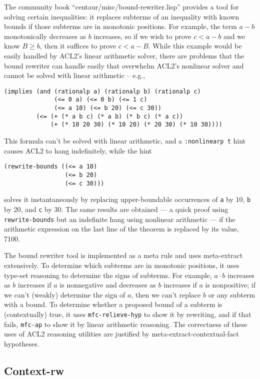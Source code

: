 The community book ``centaur/misc/bound-rewriter.lisp'' provides a
tool for solving certain inequalities: it replaces subterms of an
inequality with known bounds if those subterms are in monotonic
positions.  For example, the term $a-b$ monotonically decreases as $b$
increases, so if we wish to prove $c<a-b$ and we know $B \geq b$, then
it suffices to prove $c<a-B$.  While this example would be easily
handled by ACL2's linear arithmetic solver, there are problems that
the bound rewriter can handle easily that overwhelm ACL2's nonlinear
solver and cannot be solved with linear arithmetic -- e.g.,
\begin{verbatim}
(implies (and (rationalp a) (rationalp b) (rationalp c)
              (<= 0 a) (<= 0 b) (<= 1 c)
              (<= a 10) (<= b 20) (<= c 30))
         (<= (+ (* a b c) (* a b) (* b c) (* a c))
             (+ (* 10 20 30) (* 10 20) (* 20 30) (* 10 30))))
\end{verbatim}
This formula can't be solved with linear arithmetic, and a
\texttt{:nonlinearp t} hint causes ACL2 to hang indefinitely, while
the hint
\begin{verbatim}
(rewrite-bounds ((<= a 10)
                 (<= b 20)
                 (<= c 30)))
\end{verbatim}
solves it instantaneously by replacing upper-boundable occurrences of
\texttt{a} by 10, \texttt{b} by 20, and \texttt{c} by 30.  The same
results are obtained --- a quick proof using {\tt rewrite-bounds} but
an indefinite hang using nonlinear arithmetic --- if the arithmetic
expression on the last line of the theorem is replaced by its value,
7100.

The bound rewriter tool is implemented as a meta rule and uses
meta-extract extensively.  To determine which subterms are in
monotonic positions, it uses type-set reasoning to determine the signs
of subterms.  For example, $a \cdot b$ increases as $b$ increases if
$a$ is nonnegative and decreases as $b$ increases if $a$ is
nonpositive; if we can't (weakly) determine the sign of $a$, then we
can't replace $b$ or any subterm with a bound.  To determine whether a
proposed bound of a subterm is (contextually) true, it uses
\texttt{mfc-relieve-hyp} to show it by rewriting, and if that fails,
\texttt{mfc-ap} to show it by linear arithmetic reasoning.  The
correctness of these uses of ACL2 reasoning utilities are justified by
meta-extract-contextual-fact hypotheses.

\subsection{Context-rw}

